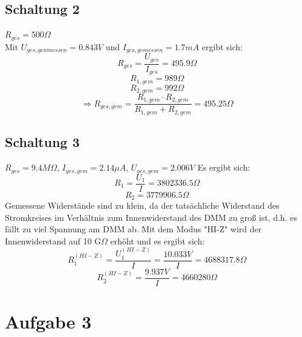 \documentclass[compress,11pt]{beamer}
\begin{document}
\begin{frame}
\subsection{Schaltung 2}
$R_{ges} = 500 \Omega$ \\ Mit $U_{ges,genmessen} = 0.843 V$ und $I_{ges,gemessen} = 1.7 mA$ ergibt sich: 
\begin{equation}
R_{ges} = \frac{U_{ges}}{I_{ges}} = 495.9 \Omega
\end{equation}
\begin{equation}
R_{1,gem} = 989 \Omega 
\end{equation}
\begin{equation}
R_{2,gem} = 992 \Omega
\end{equation}
\begin{equation}
\Rightarrow R_{ges,gem} = \frac{R_{1,gem} \cdot R_{2,gem}}{R_{1,gem} + R_{2,gem}} = 495.25 \Omega
\end{equation}
\end{frame}
\begin{frame}
\subsection{Schaltung 3}
$R_{ges} = 9.4 M \Omega$, $I_{ges,gem} = 2.14 \mu A$, $U_{ges,gem} = 2.006 V$
Es ergibt sich:
\begin{equation}
R_1 = \frac{U_1}{I} = 3802336.5 \Omega
\end{equation}
\begin{equation}
R_2 = 3779906.5 \Omega
\end{equation}
Gemessene Widerstände sind zu klein, da der tatsächliche Widerstand des Stromkreises im Verhältnis zum Innenwiderstand des DMM zu groß ist, d.h. es fällt zu viel Spannung am DMM ab. Mit dem Modus "HI-Z" wird der Innenwiderstand auf 10 G$\Omega$ erhöht und es ergibt sich:
\begin{equation}
R_1^{(HI-Z)} = \frac{U_1^{(HI-Z)}}{I} = \frac{10.033 V}{I}= 4688317.8 \Omega
\end{equation}
\begin{equation}
R_2^{(HI-Z)} = \frac{9.937 V}{I}=4660280 \Omega
\end{equation}
\end{frame}

\section{Aufgabe 3}
\end{document}
